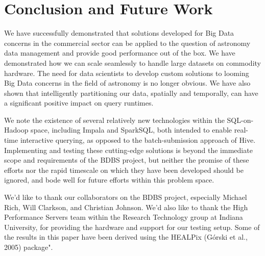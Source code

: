 \documentclass[11pt,twoside]{article}
\begin{document}

\section{Conclusion and Future Work}

We have successfully demonstrated that solutions developed for Big Data concerns in the commercial sector can be applied to the question of astronomy data management and provide good performance out of the box.  We have demonstrated how we can scale seamlessly to handle large datasets on commodity hardware.  The need for data scientists to develop custom solutions to looming Big Data concerns in the field of astronomy is no longer obvious.  We have also shown that intelligently partitioning our data, spatially and temporally, can have a significant positive impact on query runtimes.  

We note the existence of several relatively new technologies within the SQL-on-Hadoop space, including Impala and SparkSQL, both intended to enable real-time interactive querying, as opposed to the batch-submission approach of Hive.  Implementing and testing these cutting-edge solutions is beyond the immediate scope and requirements of the BDBS project, but neither the promise of these efforts nor the rapid timescale on which they have been developed should be ignored, and bode well for future efforts within this problem space.  

\acknowledgements We'd like to thank our collaborators on the BDBS project, especially Michael Rich, Will Clarkson, and Christian Johnson.  We'd also like to thank the High Performance Servers team within the Research Technology group at Indiana University, for providing the hardware and support for our testing setup. Some of the results in this paper have been derived using the HEALPix (Górski et al., 2005) package".


\begin{thebibliography}
\end{thebibliography}
\end{document}
